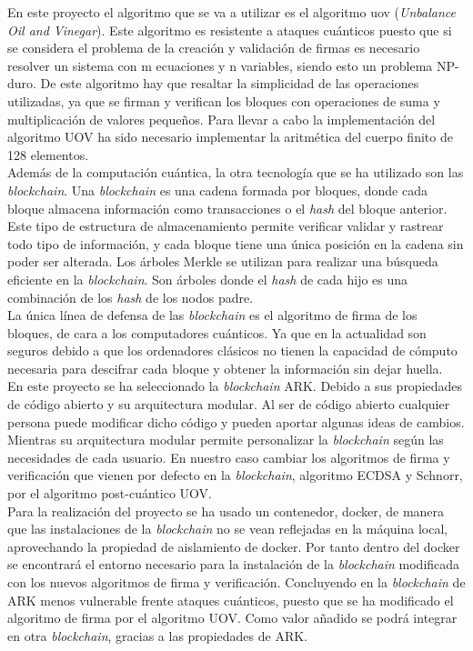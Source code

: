 En este proyecto el algoritmo que se va a utilizar es el algoritmo \acrshort{uov} (\textit{Unbalance Oil and Vinegar}). Este algoritmo es resistente a ataques cuánticos puesto que si se considera el problema de la creación y validación de firmas es necesario resolver un sistema con m ecuaciones y n variables, siendo esto un problema NP-duro. De este algoritmo hay que resaltar la simplicidad de las operaciones utilizadas, ya que se firman y verifican los bloques con operaciones de suma y multiplicación de valores pequeños. Para llevar a cabo la implementación del algoritmo UOV ha sido necesario implementar la aritmética del cuerpo finito de 128 elementos.\\

Además de la computación cuántica, la otra tecnología que se ha utilizado son las \textit{blockchain}. Una \textit{blockchain} es una cadena formada por bloques, donde cada bloque almacena información como transacciones o el \textit{hash} del bloque anterior. Este tipo de estructura de almacenamiento permite verificar validar y rastrear todo tipo de información, y cada bloque tiene una única posición en la cadena sin poder ser alterada. Los árboles Merkle se utilizan para realizar una búsqueda eficiente en la \textit{blockchain}. Son árboles donde el \textit{hash} de cada hijo es una combinación de los \textit{hash} de los nodos padre.\\

La única línea de defensa de las \textit{blockchain} es el algoritmo de firma de los bloques, de cara a los computadores cuánticos. Ya que en la actualidad son seguros debido a que los ordenadores clásicos no tienen la capacidad de cómputo necesaria para descifrar cada bloque y obtener la información sin dejar huella.\\

En este proyecto se ha seleccionado la \textit{blockchain} ARK. Debido a sus propiedades de código abierto y su arquitectura modular. Al ser de código abierto cualquier persona puede modificar dicho código y pueden aportar algunas ideas de cambios. Mientras su arquitectura modular permite personalizar la \textit{blockchain} según las necesidades de cada usuario. En nuestro caso cambiar los algoritmos de firma y verificación que vienen por defecto en la \textit{blockchain}, algoritmo ECDSA y Schnorr, por el algoritmo post-cuántico UOV.\\

Para la realización del proyecto se ha usado un contenedor, docker, de manera que las instalaciones de la \textit{blockchain} no se vean reflejadas en la máquina local, aprovechando la propiedad de aislamiento de docker. Por tanto dentro del docker se encontrará el entorno necesario para la instalación de la \textit{blockchain} modificada con los nuevos algoritmos de firma y verificación. Concluyendo en la \textit{blockchain} de ARK  menos vulnerable frente ataques cuánticos, puesto que se ha modificado el algoritmo de firma por el algoritmo UOV. Como valor añadido se podrá integrar en otra \textit{blockchain}, gracias a las propiedades de ARK.\\

